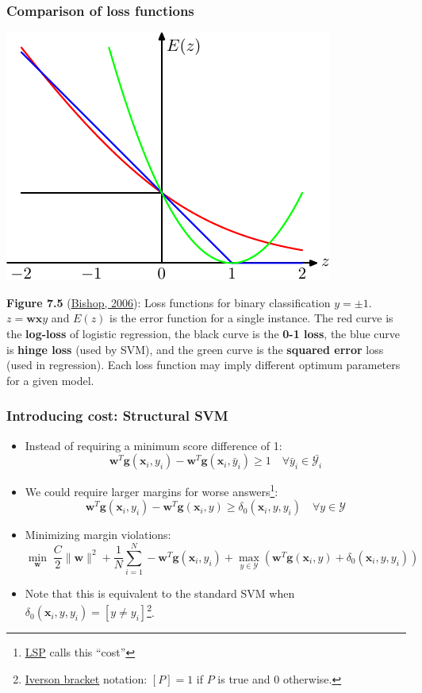 \documentclass[ignorenonframetext,plain,fleqn]{beamer}
\renewcommand{\vec}{\mathbf}
\begin{document}
\begin{frame}\frametitle{Comparison of loss functions}
\begin{center}
\includegraphics[height=.5\textheight]{images/bishop-fig-7-5.pdf}
\end{center}\footnotesize
{\bf Figure 7.5}
(\href{http://research.microsoft.com/en-us/um/people/cmbishop/prml}
{Bishop, 2006}): Loss functions for binary classification $y=\pm 1$.
$z=\mathbf{w}\mathbf{x}y$ and $E(z)$ is the error function for a
single instance.  The red curve is the {\bf log-loss} of logistic
regression, the black curve is the {\bf 0-1 loss}, the blue curve is
{\bf hinge loss} (used by SVM), and the green curve is the {\bf
  squared error} loss (used in regression).  Each loss function may
imply different optimum parameters for a given model.
\end{frame}


\begin{frame}\frametitle{Introducing cost: Structural SVM}
\begin{itemize}
\item Instead of requiring a minimum score difference of 1:
\[
  \vec{w}^T\vec{g}(\vec{x}_i,y_i) -
  \vec{w}^T\vec{g}(\vec{x}_i,\bar{y}_i) \geq 1\quad
  \forall \bar{y}_i \in \bar{\mathcal{Y}_i}
\]
\item We could require larger margins for worse answers\footnote{
  \href{http://www.morganclaypool.com/doi/abs/10.2200/S00361ED1V01Y201105HLT013}{LSP}
  calls this ``cost''}: \[
  \vec{w}^T\vec{g}(\vec{x}_i,y_i) -
  \vec{w}^T\vec{g}(\vec{x}_i,y) \geq \delta_0(\vec{x}_i,y,y_i)\quad
  \forall y \in \mathcal{Y}
\]
\item Minimizing margin violations: \[
\min_\vec{w}\; 
 \frac{C}{2} \|\vec{w}\|^2
+ \frac{1}{N} \sum_{i=1}^N 
-  \vec{w}^T\vec{g}(\vec{x}_i,y_i) + \max_{y\in\mathcal{Y}}
(  \vec{w}^T\vec{g}(\vec{x}_i,y) + \delta_0(\vec{x}_i,y,y_i))
\]
\item Note that this is equivalent to the standard SVM when
  $\delta_0(\vec{x}_i,y,y_i)=[y\neq y_i]$\footnote{
  \href{http://en.wikipedia.org/wiki/Iverson_bracket}{Iverson bracket}
  notation: $[P]=1$ if $P$ is true and 0 otherwise.}.
\end{itemize}
\end{frame}
\end{document}
